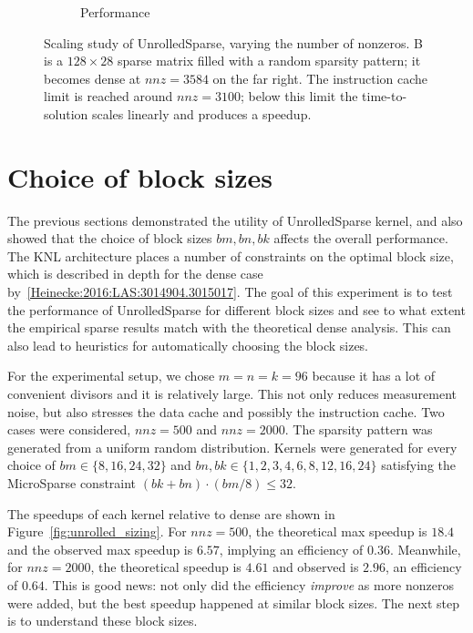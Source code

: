 \begin{figure}[H]
\begin{subfigure}[r]{0.48\textwidth}
      \caption{Performance}
      \label{fig:unrolled_perf}
    \end{subfigure}
    \caption{Scaling study of UnrolledSparse, varying the number of nonzeros. B is a $128\times 28$ sparse matrix filled with a random sparsity pattern; it becomes dense at $nnz=3584$ on the far right. The instruction cache limit is reached around $nnz=3100$; below this limit the time-to-solution scales linearly and produces a speedup. }
    \label{fig:unrolled_scaling}
  \end{figure}




\section{Choice of block sizes}
\label{section:exp_unrolled_sizing}

The previous sections demonstrated the utility of UnrolledSparse kernel, and also showed that the choice of block sizes $bm,bn,bk$ affects the overall performance. The KNL architecture places a number of constraints on the optimal block size, which is described in depth for the dense case by~\ref{Heinecke:2016:LAS:3014904.3015017}. The goal of this experiment is to test the performance of UnrolledSparse for different block sizes and see to what extent the empirical sparse results match with the theoretical dense analysis. This can also lead to heuristics for automatically choosing the block sizes.

For the experimental setup, we chose $m=n=k=96$ because it has a lot of convenient divisors and it is relatively large. This not only reduces measurement noise, but also stresses the data cache and possibly the instruction cache. Two cases were considered, $nnz=500$ and $nnz=2000$. The sparsity pattern was generated from a uniform random distribution. Kernels were generated for every choice of $bm \in \{8,16,24,32\}$ and $bn, bk \in \{1,2,3,4,6,8,12,16,24\}$ satisfying the MicroSparse constraint $(bk+bn) \cdot (bm/8) \leq 32$. 

The speedups of each kernel relative to dense are shown in Figure~\ref{fig:unrolled_sizing}. For $nnz=500$, the theoretical max speedup is $18.4$ and the observed max speedup is $6.57$, implying an efficiency of $0.36$. Meanwhile, for $nnz=2000$, the theoretical speedup is $4.61$ and observed is $2.96$, an efficiency of $0.64$. This is good news: not only did the efficiency \emph{improve} as more nonzeros were added, but the best speedup happened at similar block sizes. The next step is to understand these block sizes.

